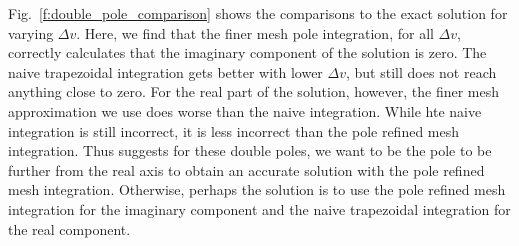 Fig.~\ref{f:double_pole_comparison} shows the comparisons to the exact solution for varying $\Delta v$.
Here, we find that the finer mesh pole integration, for all $\Delta v$, correctly calculates that the 
imaginary component of the solution is zero.
The naive trapezoidal integration gets better with lower $\Delta v$, but still does not reach anything close to zero.
For the real part of the solution, however, the finer mesh approximation we use does worse 
than the naive integration. While hte naive integration is still incorrect, it is less incorrect than the pole refined mesh integration.
Thus suggests for these double poles, we want to be the pole to be further from the real axis to obtain an accurate solution
with the pole refined mesh integration. 
Otherwise, perhaps the solution is to use the pole refined mesh integration for the imaginary component and the naive trapezoidal integration for the real component.


